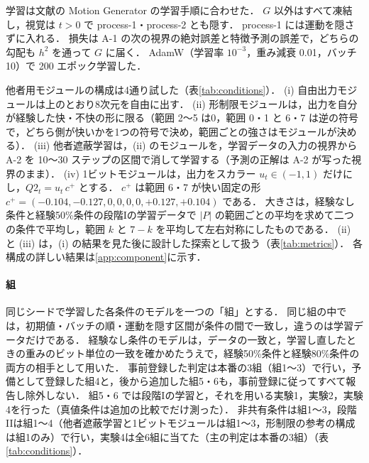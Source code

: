 学習は文献\cite{noguchi2022superposition}の Motion Generator の学習手順に合わせた．
$G$ 以外はすべて凍結し，視覚は $t>0$ で process-1・process-2 とも隠す．
process-1 には運動を隠さずに入れる．
損失は A-1 の次の視界の絶対誤差と特徴予測の誤差で，どちらの勾配も $h^2$ を通って $G$ に届く．
AdamW（学習率 $10^{-3}$，重み減衰 0.01，バッチ 10）で 200 エポック学習した．

他者用モジュールの構成は4通り試した（表\ref{tab:conditions}）．
(i) 自由出力モジュールは上のとおり8次元を自由に出す．
(ii) 形制限モジュールは，出力を自分が経験した快・不快の形に限る（範囲 2〜5 は0，範囲 0・1 と 6・7 は逆の符号で，どちら側が快いかを1つの符号で決め，範囲ごとの強さはモジュールが決める）．
(iii) 他者遮蔽学習は，(ii) のモジュールを，学習データの入力の視界から A-2 を 10〜30 ステップの区間で消して学習する（予測の正解は A-2 が写った視界のまま）．
(iv) 1ビットモジュールは，出力をスカラー $u_t\in(-1,1)$ だけにし，$Q2_t = u_t\, c^{+}$ とする．
$c^{+}$ は範囲 6・7 が快い固定の形 $c^{+}=(-0.104,-0.127,0,0,0,0,+0.127,+0.104)$ である．
大きさは，経験なし条件と経験50\%条件の段階Iの学習データで $|P|$ の範囲ごとの平均を求めて二つの条件で平均し，範囲 $k$ と $7-k$ を平均して左右対称にしたものである．
(ii) と (iii) は，(i) の結果を見た後に設計した探索として扱う（表\ref{tab:metrics}）．
各構成の詳しい結果は\ref{app:component}に示す．

\paragraph{組}
同じシードで学習した各条件のモデルを一つの「組」とする．
同じ組の中では，初期値・バッチの順・運動を隠す区間が条件の間で一致し，違うのは学習データだけである．
経験なし条件のモデルは，データの一致と，学習し直したときの重みのビット単位の一致を確かめたうえで，経験50\%条件と経験80\%条件の両方の相手として用いた．
事前登録した判定は本番の3組（組1〜3）で行い，予備として登録した組4と，後から追加した組5・6も，事前登録に従ってすべて報告し除外しない．
組5・6 では段階Iの学習と，それを用いる実験1，実験2，実験4を行った（真値条件は追加の比較でだけ測った）．
非共有条件は組1〜3，段階IIは組1〜4（他者遮蔽学習と1ビットモジュールは組1〜3，形制限の参考の構成は組1のみ）で行い，実験4は全6組に当てた（主の判定は本番の3組）（表\ref{tab:conditions}）．

\begin{table}[t]
  \centering
  \small
  \caption{条件と組の一覧．$p$ は規則の一歩を選ぶ確率で，実際に規則で動いた一歩の割合は経験50\%条件で48\%，経験80\%条件で57\%である．}
  \label{tab:conditions}
  
\end{table}

